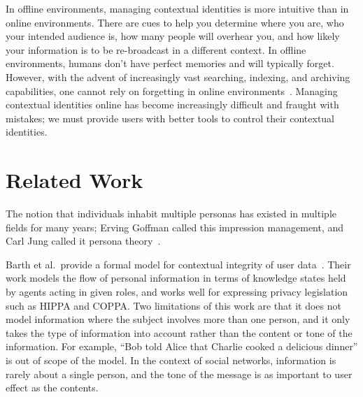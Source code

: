\documentclass[10pt, conference, compsocconf]{IEEEtran}
\begin{document}
\begin{comment}
zuckerberg on "having multiple identities is dishonest"
http://books.google.ca/books?id=RRUkLhyGZVgC&pg=PA199&lpg=PA199&dq=%
\end{comment}

In offline environments, managing contextual identities is more intuitive than
in online environments. There are cues to help you determine where you are,
who your intended audience is, how many people will overhear you, and how
likely your information is to be re-broadcast in a different context. 
In offline environments, humans don't have perfect memories and
will typically forget.  However, with the advent of increasingly vast
searching, indexing, and archiving capabilities, one cannot rely on forgetting
in online environments~\cite{delete}. Managing contextual identities
online has become increasingly difficult and fraught with mistakes; we must
provide users with better tools to control their contextual identities.

\section{Related Work}

The notion that individuals inhabit multiple personas has existed in multiple
fields for many years; Erving Goffman called this impression management, and
Carl Jung called it persona theory~\cite{goffman,jung}.

Barth et al.~provide a formal model for contextual
integrity of user data~\cite{barth}. Their work models
the flow of personal information in terms of knowledge states held by agents
acting in given roles, and works well for expressing privacy legislation such as
HIPPA and COPPA. Two limitations of this work are that it does not
model information where the subject involves more than one person, and it
only takes the type of information into account rather than the content or tone
of the information. For example, ``Bob told Alice that Charlie cooked a
delicious dinner'' is out of scope of the model.  In the context of social
networks, information is rarely about a single person, and the tone of the
message is as important to user effect as the contents.
\end{document}

